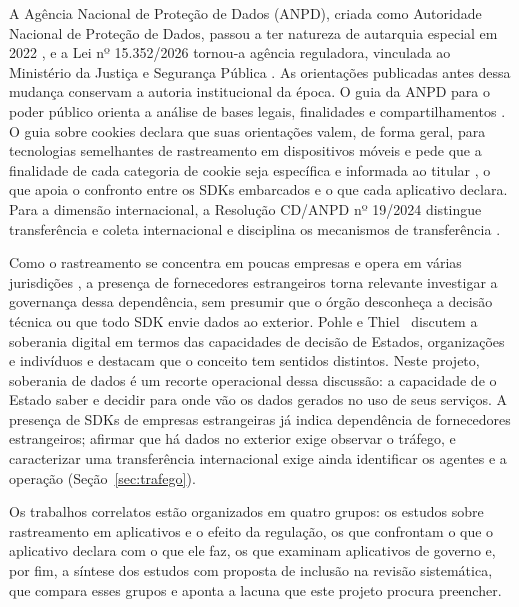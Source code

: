 A Agência Nacional de Proteção de Dados (ANPD), criada como Autoridade Nacional de Proteção de Dados, passou a ter natureza de autarquia especial em 2022 \cite{brasil2022}, e a Lei nº 15.352/2026 tornou-a agência reguladora, vinculada ao Ministério da Justiça e Segurança Pública \cite{brasil2026}. As orientações publicadas antes dessa mudança conservam a autoria institucional da época. O guia da ANPD para o poder público orienta a análise de bases legais, finalidades e compartilhamentos \cite{anpd2023}. O guia sobre cookies declara que suas orientações valem, de forma geral, para tecnologias semelhantes de rastreamento em dispositivos móveis \cite[p.~6]{anpd2022} e pede que a finalidade de cada categoria de cookie seja específica e informada ao titular \cite[p.~14]{anpd2022}, o que apoia o confronto entre os SDKs embarcados e o que cada aplicativo declara. Para a dimensão internacional, a Resolução CD/ANPD nº 19/2024 distingue transferência e coleta internacional e disciplina os mecanismos de transferência \cite{anpd2024}.

Como o rastreamento se concentra em poucas empresas e opera em várias jurisdições \cite{binns2018,kollnig2021before}, a presença de fornecedores estrangeiros torna relevante investigar a governança dessa dependência, sem presumir que o órgão desconheça a decisão técnica ou que todo SDK envie dados ao exterior. Pohle e Thiel~\cite{pohle2020} discutem a soberania digital em termos das capacidades de decisão de Estados, organizações e indivíduos e destacam que o conceito tem sentidos distintos. Neste projeto, soberania de dados é um recorte operacional dessa discussão: a capacidade de o Estado saber e decidir para onde vão os dados gerados no uso de seus serviços. A presença de SDKs de empresas estrangeiras já indica dependência de fornecedores estrangeiros; afirmar que há dados no exterior exige observar o tráfego, e caracterizar uma transferência internacional exige ainda identificar os agentes e a operação (Seção~\ref{sec:trafego}).

\label{sec:correlatos}

Os trabalhos correlatos estão organizados em quatro grupos: os estudos sobre rastreamento em aplicativos e o efeito da regulação, os que confrontam o que o aplicativo declara com o que ele faz, os que examinam aplicativos de governo e, por fim, a síntese dos estudos com proposta de inclusão na revisão sistemática, que compara esses grupos e aponta a lacuna que este projeto procura preencher.

\label{sec:ref-regulacao}

